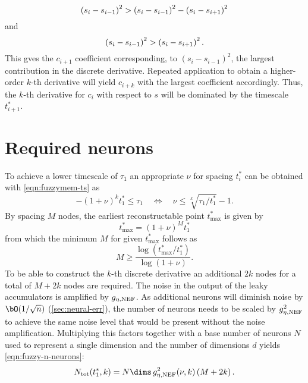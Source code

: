 \begin{equation}
    \del{s_i - s_{i-1}}^2 > \del{s_i - s_{i-1}}^2 - \del{s_i - s_{i+1}}^2
\end{equation}
and
\begin{equation}
    \del{s_i - s_{i-1}}^2 > \del{s_i - s_{i+1}}^2 \text{.}
\end{equation}
This gves the $c_{i+1}$ coefficient corresponding, to $(s_i - s_{i-1})^2$, the largest contribution in the discrete derivative.
Repeated application to obtain a higher-order $k$-th derivative will yield $c_{i+k}$ with the largest coefficient accordingly.
Thus, the $k$-th derivative for $c_i$ with respect to $s$ will be dominated by the timescale $t^*_{i+1}$.


\section{Required neurons}\label{apdx:fuzzymem-neurons}
To achieve a lower timescale of $\tau_1$ an appropriate $\nu$ for spacing $t^*_i$ can be obtained with \cref{eqn:fuzzymem-ts} as
\begin{equation}
    -{(1+\nu)}^k t^*_1 \leq \tau_1 \quad\Leftrightarrow\quad \nu \leq \sqrt[k]{\tau_1 / t^*_1} - 1 \text{.}
\end{equation}
By spacing $M$ nodes, the earliest reconstructable point $t^*_{\max}$ is given by
\begin{equation}
    t^*_{\max} = {(1+\nu)}^M t^*_1
\end{equation}
from which the minimum $M$ for given $t^*_{\max}$ follows as
\begin{equation}
    M \geq \frac{\log(t^*_{\max} / t^*_1)}{\log(1+\nu)} \text{.}
\end{equation}
To be able to construct the $k$-th discrete derivative an additional $2k$ nodes for a total of $M + 2k$ nodes are required.
The noise in the output of the leaky accumulators is amplified by $g_{\eta,{\mathrm{NEF}}}$.
As additional neurons will diminish noise by $\bO(1/\sqrt{n})$ (\cref{sec:neural-err}), the number of neurons needs to be scaled by $g_{\eta,{\mathrm{NEF}}}^2$ to achieve the same noise level that would be present without the noise amplification.
Multiplying this factors together with a base number of neurons $N$ used to represent a single dimension and the number of dimensions $d$ yields \cref{eqn:fuzzy-n-neurons}:
\begin{equation*}
    N_{\ped{tot}}(t^*_1, k) = N \dims\, g_{\eta,\ped{NEF}}^2(\nu, k) \del{M + 2k} \text{.}
\end{equation*}
